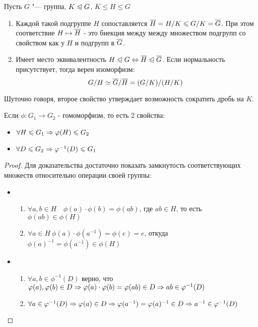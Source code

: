 \begin{theorem}
	Пусть $G$ "--- группа, $K \trianglelefteqslant G$, $K \le H \le G$
	\begin{enumerate}
		\item Каждой такой подгруппе $H$ сопоставляется $\overline{H} = H / K \leqslant G / K = \overline{G}$.
		При этом соответствие $H \mapsto \overline{H}$ - это биекция между между множеством подгрупп со свойством как у $H$ и подгрупп в $\overline{G}$.
		
		\item Имеет место эквивалентность $H \trianglelefteqslant G \Leftrightarrow \overline{H} \trianglelefteqslant \overline{G}$. Если нормальность присутствует, тогда верен изоморфизм:
		\[
			G / H \simeq \overline{G} / \overline{H} = (G / K) / (H / K)
		\]
	\end{enumerate}
\end{theorem}

\begin{note}
	Шуточно говоря, второе свойство утверждает возможность сократить дробь на $K$.
\end{note}

\begin{proposition}
	Если $\phi \colon G_1 \to G_2$ - гомоморфизм, то есть 2 свойства:
	\begin{itemize}
		\item \(\forall H \leqslant G_1 \Rightarrow \varphi(H) \leqslant G_2\)
		
		\item \(\forall D \leqslant G_2 \Rightarrow \varphi^{-1}(D) \leqslant G_1\)
	\end{itemize}
\end{proposition}

\begin{proof}
	Для доказательства достаточно показать замкнутость соответствующих множеств относительно операции своей группы:
	\begin{itemize}
		\item \begin{enumerate}
			\item \(\forall a, b \in H \quad \phi(a) \cdot \phi(b) = \phi(ab)\), где $ab \in H$, то есть $\phi(ab) \in \phi(H)$
			
			\item \(\forall a \in H\ \phi(a) \cdot \phi(a^{-1}) = \phi(e) = e\), откуда $\phi(a)^{-1} = \phi(a^{-1}) \in \phi(H)$
		\end{enumerate}
		
		\item \begin{enumerate}
			\item \(\forall a, b \in \phi^{-1}(D)\) верно, что $\varphi(a), \varphi(b) \in D \Rightarrow \varphi(a) \cdot \varphi(b) = \varphi(ab) \in D \Rightarrow ab \in \varphi^{-1}(D)$
			
			\item \(\forall a \in \varphi^{-1}(D) \Rightarrow \varphi(a) \in D \Rightarrow \varphi(a^{-1}) = \varphi(a)^{-1} \in D \Rightarrow a^{-1} \in \varphi^{-1}(D)\)
		\end{enumerate}
	\end{itemize}
\end{proof}

